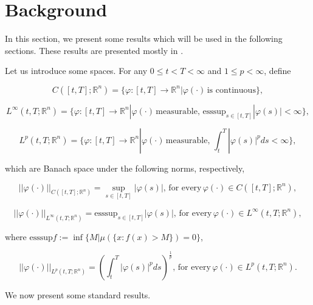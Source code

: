 \section{Background}

In this section, we present some results which will be used in the following sections. These results are presented mostly in \cite{Yong2015}.

Let us introduce some spaces. For any $0\leq t< T<\infty$ and $1\leq p <\infty$, define

\begin{equation*}
C([t,T];\mathbb{R}^n)=\{\varphi:[t,T]\rightarrow \mathbb{R}^n | \varphi(\cdot)\,\mbox{is continuous}\},
\end{equation*}

\begin{equation*}
\displaystyle L^{\infty}(t,T;\mathbb{R}^n)=\{\varphi:[t,T]\rightarrow \mathbb{R}^n | \varphi(\cdot)\,\mbox{measurable},\, \displaystyle \mbox{esssup}_{s\in[t,T]}|\varphi(s)|<\infty\},
\end{equation*}

\begin{equation*}
\displaystyle L^{p}(t,T;\mathbb{R}^n)=\{\varphi:[t,T]\rightarrow \mathbb{R}^n | \varphi(\cdot)\,\mbox{measurable},\, \int_{t}^{T}|\varphi(s)|^p ds<\infty\},
\end{equation*}

which are Banach space under the following norms, respectively, 

\begin{equation*}
||\varphi(\cdot)||_{C([t,T];\mathbb{R}^n)}=\sup_{s\in[t,T]} |\varphi(s)|,\,\mbox{for every}\, \varphi(\cdot) \in C([t,T];\mathbb{R}^n),
\end{equation*}

\begin{equation*}
||\varphi(\cdot)||_{L^{\infty}(t,T;\mathbb{R}^n)}=\mbox{esssup}_{s\in[t,T]} |\varphi(s)|,\,\mbox{for every}\, \varphi(\cdot) \in L^{\infty}(t,T;\mathbb{R}^n),
\end{equation*}

where $\mbox{esssup} f:=\inf\{M | \mu(\{x: f(x)>M\})=0\}$,

\begin{equation*}
||\varphi(\cdot)||_{L^{p}(t,T;\mathbb{R}^n)}=\left(\int_{t}^{T}|\varphi(s)|^p ds\right)^\frac{1}{p},\,\mbox{for every}\, \varphi(\cdot) \in L^{p}(t,T;\mathbb{R}^n).
\end{equation*}

We now present some standard results.


